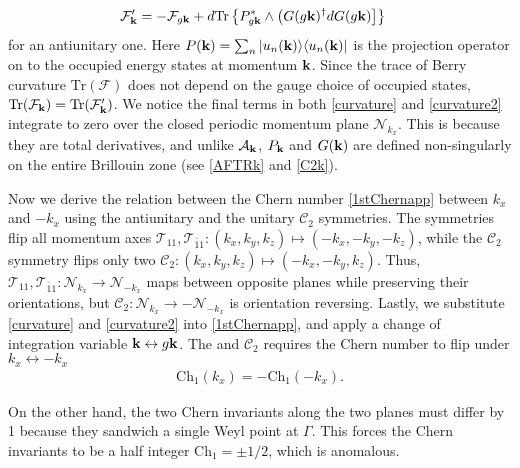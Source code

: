 \begin{align}
\mathcal{F}'_{\bf k}&=-\mathcal{F}_{g{\bf k}}+d\mathrm{Tr}\left\{P_{g\bf{k}}^\ast\wedge\left(G(g{\bf k})^\dagger dG(g{\bf k})\right]\right\}\label{curvature2}\end{align} for an antiunitary one. Here $P({\bf k})=\sum_n|u_n({\bf k})\rangle\langle u_n({\bf k})|$ is the projection operator on to the occupied energy states at momentum ${\bf k}$. Since the trace of Berry curvature $\mathrm{Tr}(\mathcal{F})$ does not depend on the gauge choice of occupied states, $\mathrm{Tr}(\mathcal{F}_{\bf k})=\mathrm{Tr}(\mathcal{F}'_{\bf k})$. We notice the final terms in both \eqref{curvature} and \eqref{curvature2} integrate to zero over the closed periodic momentum plane $\mathcal{N}_{k_x}$. This is because they are total derivatives, and unlike $\mathcal{A}_{\bf k}$, $P_{\bf k}$ and $G({\bf k})$ are defined non-singularly on the entire Brillouin zone (see \eqref{AFTRk} and \eqref{C2k}). 

Now we derive the relation between the Chern number \eqref{1stChernapp} between $k_x$ and $-k_x$ using the antiunitary \AFTR and the unitary $\mathcal{C}_2$ symmetries. The \AFTR symmetries flip all momentum axes $\mathcal{T}_{11},\mathcal{T}_{\bar{1}1}:(k_x,k_y,k_z)\mapsto(-k_x,-k_y,-k_z)$, while the $\mathcal{C}_2$ symmetry flips only two $\mathcal{C}_2:(k_x,k_y,k_z)\mapsto(-k_x,-k_y,k_z)$. Thus, $\mathcal{T}_{11},\mathcal{T}_{\bar{1}1}:\mathcal{N}_{k_x}\to\mathcal{N}_{-k_x}$ maps between opposite planes while preserving their orientations, but $\mathcal{C}_2:\mathcal{N}_{k_x}\to-\mathcal{N}_{-k_x}$ is orientation reversing. Lastly, we substitute \eqref{curvature} and \eqref{curvature2} into \eqref{1stChernapp}, and apply a change of integration variable ${\bf k}\leftrightarrow g{\bf k}$. The \AFTR and $\mathcal{C}_2$ requires the Chern number to flip under $k_x\leftrightarrow-k_x$ \begin{align}\mathrm{Ch}_1(k_x)=-\mathrm{Ch}_1(-k_x).\end{align}


 On the other hand, the two Chern invariants along the two planes must differ by 1 because they sandwich a single Weyl point at $\Gamma$. This forces the Chern invariants to be a half integer $\mathrm{Ch}_1=\pm1/2$, which is anomalous.

